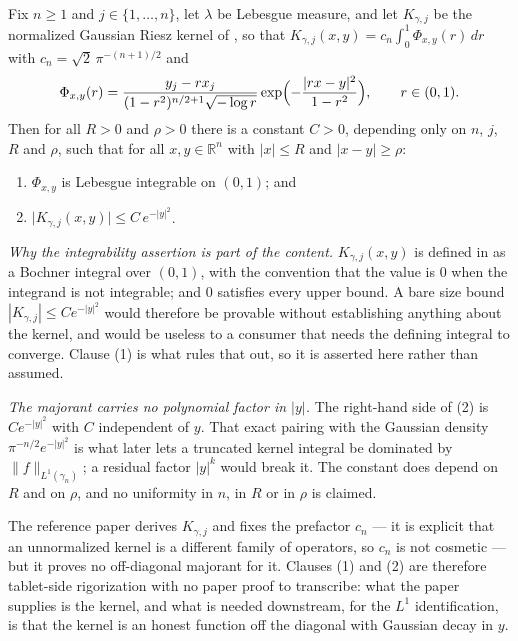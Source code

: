 \begin{lemma}
Fix $n \geq 1$ and $j \in \{1,\ldots,n\}$, let $\lambda$ be Lebesgue measure, and let
$K_{\gamma,j}$ be the normalized Gaussian Riesz kernel of , so
that $K_{\gamma,j}(x,y) = c_n\int_0^1\Phi_{x,y}(r)\,dr$ with
$c_n = \sqrt2\,\pi^{-(n+1)/2}$ and
\[
  \Phi_{x,y}(r)
    = \frac{y_j - r x_j}{(1-r^2)^{n/2+1}\sqrt{-\log r}}
      \exp\Bigl(-\frac{|rx-y|^2}{1-r^2}\Bigr),
  \qquad r \in (0,1) .
\]
Then for all $R > 0$ and $\rho > 0$ there is a constant $C > 0$, depending only on $n$,
$j$, $R$ and $\rho$, such that for all $x,y \in \mathbb{R}^n$ with $|x| \leq R$ and
$|x-y| \geq \rho$:
\begin{enumerate}
\item $\Phi_{x,y}$ is Lebesgue integrable on $(0,1)$; and
\item $\bigl|K_{\gamma,j}(x,y)\bigr| \leq C\,e^{-|y|^2}$.
\end{enumerate}

\emph{Why the integrability assertion is part of the content.}
$K_{\gamma,j}(x,y)$ is defined in  as a Bochner integral over
$(0,1)$, with the convention that the value is $0$ when the integrand is not integrable;
and $0$ satisfies every upper bound.  A bare size bound
$|K_{\gamma,j}| \leq Ce^{-|y|^2}$ would therefore be provable without establishing
anything about the kernel, and would be useless to a consumer that needs the defining
integral to converge.  Clause (1) is what rules that out, so it is asserted here rather
than assumed.

\emph{The majorant carries no polynomial factor in $|y|$.}
The right-hand side of (2) is $Ce^{-|y|^2}$ with $C$ independent of $y$.  That exact
pairing with the Gaussian density $\pi^{-n/2}e^{-|y|^2}$ is what later lets a truncated
kernel integral be dominated by $\|f\|_{L^1(\gamma_n)}$; a residual factor $|y|^k$ would
break it.  The constant does depend on $R$ and on $\rho$, and no uniformity in $n$, in
$R$ or in $\rho$ is claimed.

The reference paper derives $K_{\gamma,j}$ and fixes the prefactor $c_n$ --- it is
explicit that an unnormalized kernel is a different family of operators, so $c_n$ is not
cosmetic --- but it proves no off-diagonal majorant for it.  Clauses (1) and (2) are
therefore tablet-side rigorization with no paper proof to transcribe: what the paper
supplies is the kernel, and what is needed downstream, for the $L^1$ identification, is
that the kernel is an honest function off the diagonal with Gaussian decay in $y$.
\end{lemma}
